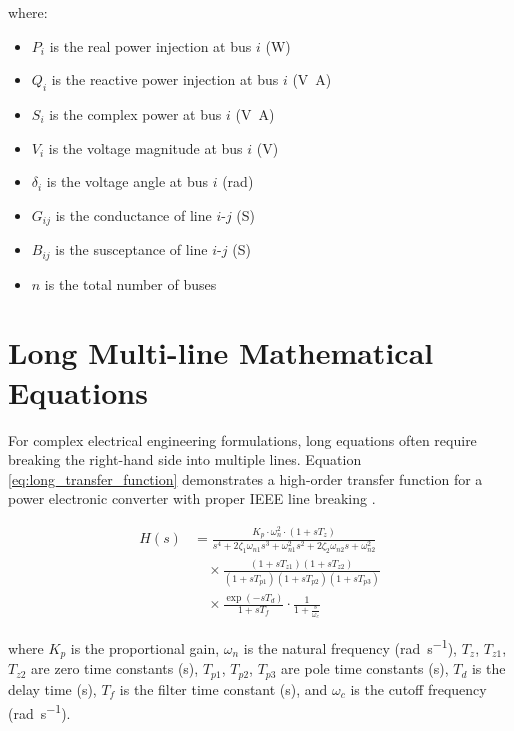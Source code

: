 where:
\begin{itemize}
	\item $P_i$ is the real power injection at bus $i$ (\unit{\watt})
	\item $Q_i$ is the reactive power injection at bus $i$ (\unit{\volt\ampere})  
	\item $S_i$ is the complex power at bus $i$ (\unit{\volt\ampere})
	\item $V_i$ is the voltage magnitude at bus $i$ (\unit{\volt})
	\item $\delta_i$ is the voltage angle at bus $i$ (\unit{\radian})
	\item $G_{ij}$ is the conductance of line $i$-$j$ (\unit{\siemens})
	\item $B_{ij}$ is the susceptance of line $i$-$j$ (\unit{\siemens})
	\item $n$ is the total number of buses
\end{itemize}

\section{Long Multi-line Mathematical Equations}
\label{sec:long_equations}

For complex electrical engineering formulations, long equations often require breaking the right-hand side into multiple lines. Equation \ref{eq:long_transfer_function} demonstrates a high-order transfer function for a power electronic converter with proper IEEE line breaking \cite{mohan2003power}.

\begin{equation}
	\begin{split}
		H(s) &= \frac{K_p \cdot \omega_n^2 \cdot (1 + sT_z)}{s^4 + 2\zeta_1\omega_{n1}s^3 + \omega_{n1}^2s^2 + 2\zeta_2\omega_{n2}s + \omega_{n2}^2} \\
		&\quad \times \frac{(1 + sT_{z1})(1 + sT_{z2})}{(1 + sT_{p1})(1 + sT_{p2})(1 + sT_{p3})} \\
		&\quad \times \frac{\exp(-sT_d)}{1 + sT_f} \cdot \frac{1}{1 + \frac{s}{\omega_c}}
	\end{split}
	\label{eq:long_transfer_function}
\end{equation}

where $K_p$ is the proportional gain, $\omega_n$ is the natural frequency (\unit{\radian\per\second}), $T_z$, $T_{z1}$, $T_{z2}$ are zero time constants (\unit{\second}), $T_{p1}$, $T_{p2}$, $T_{p3}$ are pole time constants (\unit{\second}), $T_d$ is the delay time (\unit{\second}), $T_f$ is the filter time constant (\unit{\second}), and $\omega_c$ is the cutoff frequency (\unit{\radian\per\second}).

